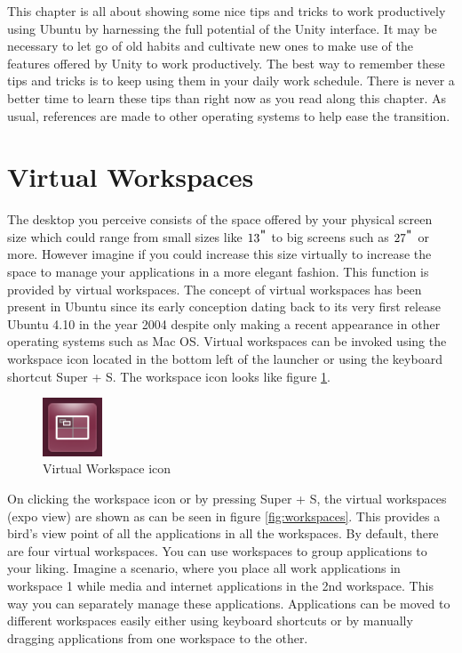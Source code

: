 This chapter is all about showing some nice tips and tricks to work productively using Ubuntu by harnessing the full potential of the Unity interface. It may be necessary to let go of old habits and cultivate new ones to make use of the features offered by Unity to work productively. The best way to remember these tips and tricks is to keep using them in your daily work schedule. There is never a better time to learn these tips than right now as  you read along this chapter. As usual, references are made to other operating systems to help ease the transition.

\section{Virtual Workspaces} \label{sect:virtual-workspaces} 
The desktop you perceive consists of the space offered by your physical screen size which could range from small sizes like $13^{\verb+"+}$ to big screens such as $27^{\verb+"+}$ or more. However imagine if you could increase this size virtually to increase the space to manage your applications in a more elegant fashion. This function is provided by virtual workspaces. The concept of virtual workspaces has been present in Ubuntu since its early conception dating back to its very first release Ubuntu 4.10 in the year 2004 despite only making a recent appearance in other operating systems such as Mac OS. Virtual workspaces can be invoked using the workspace icon located in the bottom left of the launcher or using the keyboard shortcut Super + S. The workspace icon looks like figure \ref{fig:workspace-icon}.

\begin{figure}[ht!]	
	\centering
	\includegraphics[width=50pt]{./images/work-ubuntu/workspace-icon.png}
	\caption{Virtual Workspace icon}	
	\label{fig:workspace-icon}		
\end{figure}

\par \noindent On clicking the workspace icon or by pressing Super + S, the virtual workspaces (expo view) are shown as can be seen in figure \ref{fig:workspaces}. This provides a bird's view point of all the applications in all the workspaces. By default, there are four virtual workspaces. You can use workspaces to group applications to your liking. Imagine a scenario, where you place all work applications in workspace 1 while media and internet applications in the 2nd workspace. This way you can separately manage these applications. Applications can be moved to different workspaces easily either using keyboard shortcuts or by manually dragging applications from one workspace to the other. \\

